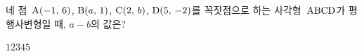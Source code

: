 네 점~$\mathrm{A}(-1,\mkern3mu 6)$, $\mathrm{B}(a,\mkern3mu 1)$, $\mathrm{C}(2,\mkern3mu b)$, $\mathrm{D}(5,\mkern3mu -2)$를 꼭짓점으로 하는 사각형~$\mathrm{ABCD}$가 평행사변형일 때, $a-b$의 값은?
\begin{choices32}{$1$}{$2$}{$3$}{$4$}{$5$}\end{choices32}
